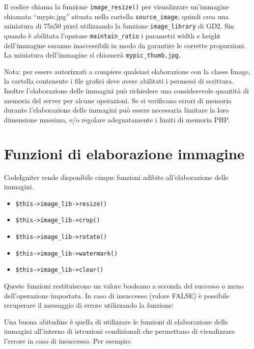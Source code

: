 Il codice chiama la funzione \verb|image_resize()| per visualizzare un'immagine chiamata ``mypic.jpg'' situata nella cartella \verb|source_image|, quindi crea una miniatura di 75x50 pixel utilizzando la funzione \verb|image_library| di GD2. Sin quando è abilitata l'opzione \verb|maintain_ratio| i parametri width e height dell'immagine saranno inaccessibili in modo da garantire le corrette proporzioni. La miniatura dell'immagine si chiamerà \verb|mypic_thumb.jpg|.

Nota: per essere autorizzati a compiere qualsiasi elaborazione con la classe Image, la cartella contenente i file grafici deve avere abilitati i permessi di scrittura. Inoltre l'elaborazione delle immagini può richiedere una considerevole quantità di memoria del server per alcune operazioni. Se si verificano errori di memoria durante l'elaborazione delle immagini può essere necessaria limitare la loro dimensione massima, e/o regolare adeguatamente i limiti di memoria \ac{PHP}.

\section*{Funzioni di elaborazione immagine}
CodeIgniter rende disponibile cinque funzioni adibite all'elaborazione delle immagini.

\begin{itemize}
\item \verb|$this->image_lib->resize()|

\item \verb|$this->image_lib->crop()|

\item \verb|$this->image_lib->rotate()|

\item \verb|$this->image_lib->watermark()|

\item \verb|$this->image_lib->clear()|
\end{itemize}

Queste funzioni restituiscono un valore booleano a seconda del successo o meno dell'operazione impostata. In caso di insuccesso (valore FALSE) è possibile recuperare il messaggio di errore utilizzando la funzione:


Una buona abitudine è quella di utilizzare le funzioni di elaborazione delle immagini all'interno di istruzioni condizionali che permettano di visualizzare l'errore in caso di insuccesso. Per esempio:


